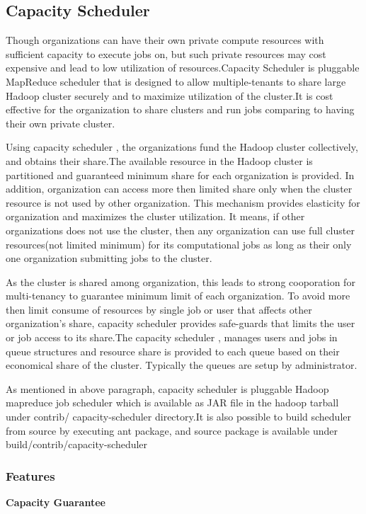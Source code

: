  \subsection{Capacity Scheduler}
 
Though organizations can have their own private compute resources with sufficient capacity to execute jobs on, but such private resources may cost expensive and lead to low utilization of resources.Capacity Scheduler is pluggable MapReduce scheduler that is designed to allow multiple-tenants to share large Hadoop cluster securely and to maximize utilization of the cluster.It is cost effective for the organization to share clusters and run jobs comparing to having their own private cluster. 

 Using capacity scheduler , the organizations fund the Hadoop cluster collectively, and obtains their share.The available resource in the Hadoop cluster is partitioned and  guaranteed  minimum share for each organization is provided. In addition, organization can access more then limited share only when the cluster resource is not used by other organization. This mechanism provides elasticity for organization and maximizes the cluster utilization. It means, if other organizations does not use the cluster, then any organization can use full cluster resources(not limited minimum) for its computational jobs as long as their only one organization submitting jobs to the cluster.
 
 As the cluster is shared among organization, this leads to strong cooporation for multi-tenancy to guarantee minimum limit of each organization. To avoid more then limit consume of resources  by single job or user that affects other organization's share, capacity scheduler provides safe-guards that limits the user or job access to its share.The capacity scheduler , manages users and jobs in queue structures and resource share is provided to each queue based on their economical share of the cluster. Typically the queues are setup by administrator.
 
 As mentioned in above paragraph, capacity scheduler is pluggable Hadoop mapreduce job scheduler which is available as JAR file in the hadoop tarball under contrib/ capacity-scheduler directory.It is also possible to build scheduler from source by executing ant package, and source package is available under build/contrib/capacity-scheduler
 
   

 
 
 \subsubsection*{Features}
 \textbf{Capacity Guarantee}

